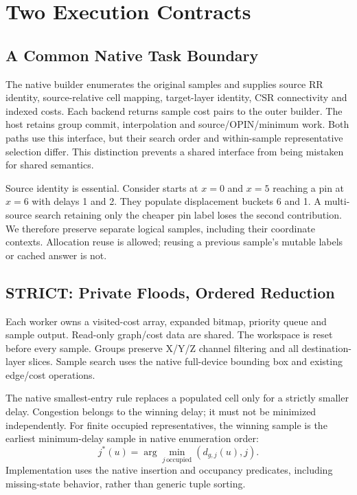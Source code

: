 \section{Two Execution Contracts}
\subsection{A Common Native Task Boundary}
The native builder enumerates the original samples and supplies source RR identity, source-relative cell mapping, target-layer identity, CSR connectivity and indexed costs. Each backend returns sample cost pairs to the outer builder. The host retains group commit, interpolation and source/OPIN/minimum work. Both paths use this interface, but their search order and within-sample representative selection differ. This distinction prevents a shared interface from being mistaken for shared semantics.

Source identity is essential. Consider starts at $x=0$ and $x=5$ reaching a pin at $x=6$ with delays 1 and 2. They populate displacement buckets 6 and 1. A multi-source search retaining only the cheaper pin label loses the second contribution. We therefore preserve separate logical samples, including their coordinate contexts. Allocation reuse is allowed; reusing a previous sample's mutable labels or cached answer is not.



\subsection{STRICT: Private Floods, Ordered Reduction}
Each worker owns a visited-cost array, expanded bitmap, priority queue and sample output. Read-only graph/cost data are shared. The workspace is reset before every sample. Groups preserve X/Y/Z channel filtering and all destination-layer slices. Sample search uses the native full-device bounding box and existing edge/cost operations.

The native smallest-entry rule replaces a populated cell only for a strictly smaller delay. Congestion belongs to the winning delay; it must not be minimized independently. For finite occupied representatives, the winning sample is the earliest minimum-delay sample in native enumeration order:
\begin{equation}
j^*(u)=\arg\min_{j\,\mathrm{occupied}}(d_{g,j}(u),j).
\end{equation}
Implementation uses the native insertion and occupancy predicates, including missing-state behavior, rather than generic tuple sorting.

